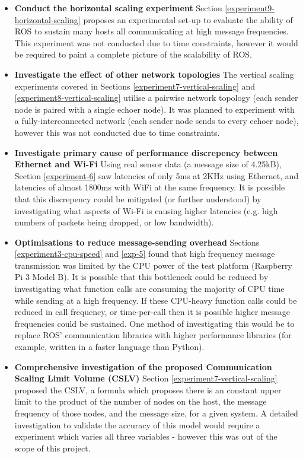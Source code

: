\documentclass[../dissertation.tex]{subfiles}
\begin{document}
\begin{itemize}

  \item \textbf{Conduct the horizontal scaling experiment} Section \ref{experiment9-horizontal-scaling} proposes an experimental set-up to evaluate the ability of ROS to sustain many hosts all communicating at high message frequencies. This experiment was not conducted due to time constraints, however it would be required to paint a complete picture of the scalability of ROS.

  \item \textbf{Investigate the effect of other network topologies} The vertical scaling experiments covered in Sections \ref{experiment7-vertical-scaling} and \ref{experiment8-vertical-scaling} utilise a pairwise network topology (each sender node is paired with a single echoer node). It was planned to experiment with a fully-interconnected network (each sender node sends to every echoer node), however this was not conducted due to time constraints.

	\item \textbf{Investigate primary cause of performance discrepency between Ethernet and Wi-Fi} Using real sensor data (a message size of 4.25kB), Section \ref{experiment-6} saw latencies of only 5ms at 2KHz using Ethernet, and latencies of almost 1800ms with WiFi at the same frequency. It is possible that this discrepency could be mitigated (or further understood) by investigating what aspects of Wi-Fi is causing higher latencies (e.g. high numbers of packets being dropped, or low bandwidth).

  \item \textbf{Optimisations to reduce message-sending overhead} Sections \ref{experiment3-cpu-speed} and \ref{exp-5} found that high frequency message transmission was limited by the CPU power of the test platform (Raspberry Pi 3 Model B). It is possible that this bottleneck could be reduced by investigating what function calls are consuming the majority of CPU time while sending at a high frequency. If these CPU-heavy function calls could be reduced in call frequency, or time-per-call then it is possible higher message frequencies could be sustained. One method of investigating this would be to replace ROS' communication libraries with higher performance libraries (for example, written in a faster language than Python).

  \item \textbf{Comprehensive investigation of the proposed Communication Scaling Limit Volume (CSLV)} Section \ref{experiment7-vertical-scaling} proposed the CSLV, a formula which proposes there is an constant upper limit to the product of the number of nodes on the host, the message frequency of those nodes, and the message size, for a given system. A detailed investigation to validate the accuracy of this model would require a experiment which varies all three variables - however this was out of the scope of this project.


\end{itemize}
\end{document}
